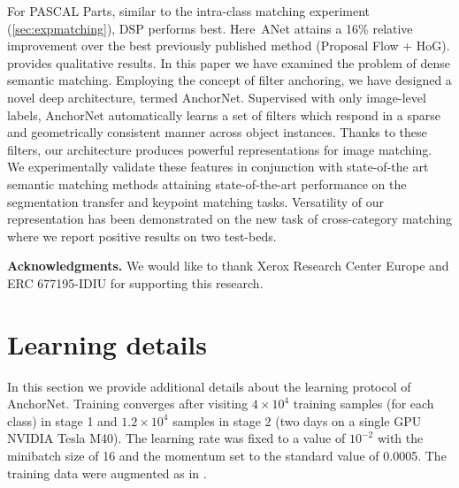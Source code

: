 \documentclass[10pt,twocolumn,letterpaper]{article}
\def\methodname{ANet\xspace}
\newcommand{\myparagraph}[1]{\vspace{0.15cm}\noindent\textbf{#1.}}
\begin{document}
For PASCAL Parts, similar to the intra-class matching experiment (\cref{sec:expmatching}), DSP performs best. Here~\methodname attains a 16\% relative improvement over the best previously published method (Proposal Flow + HoG). 
 provides qualitative results. %
In this paper we have examined the problem of dense semantic matching.
Employing the concept of filter anchoring, we have designed a novel deep architecture, termed AnchorNet.
Supervised with only image-level labels, AnchorNet automatically learns a set of filters which respond in a sparse and geometrically consistent manner across object instances. Thanks to these filters, our architecture produces powerful representations for image matching. We experimentally validate these features in conjunction with state-of-the art semantic matching methods attaining state-of-the-art
performance on the segmentation transfer and keypoint matching tasks.
Versatility of our representation has been demonstrated on the new task of cross-category matching where we report positive results on two test-beds.

\myparagraph{Acknowledgments} We would like to thank Xerox Research Center Europe and ERC 677195-IDIU for supporting this research.

\appendix
\renewcommand{\thetable}{\Alph{table}}\renewcommand{\thefigure}{\Alph{figure}}\section{Learning details}

In this section we provide additional details about the learning protocol of AnchorNet.
Training converges after visiting $4 \times 10^4$ training samples (for each class) in stage 1 and $1.2 \times10^4$ samples in stage 2 (two days on a single GPU NVIDIA Tesla M40). 
The learning rate was fixed to a value of $10^{-2}$ with the minibatch size of 16 and the momentum set to the standard value of 0.0005.
The training data were augmented as in \cite{he2015deep}.
\end{document}
